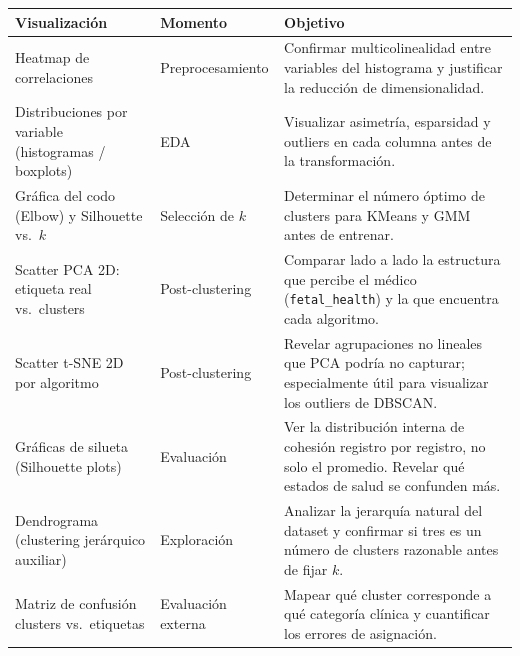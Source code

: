 \documentclass[12pt,letterpaper]{article}
\renewcommand{\arraystretch}{1.30}
\begin{document}
\begin{table}[H]
\centering
\small
\renewcommand{\arraystretch}{1.3}
\begin{tabular}{|p{3cm}|p{3.3cm}|p{7.5cm}|}
\hline
\rowcolor{headbg}
\textbf{Visualización} & \textbf{Momento} & \textbf{Objetivo} \\
\hline
Heatmap de correlaciones & Preprocesamiento & Confirmar multicolinealidad entre variables del histograma y justificar la reducción de dimensionalidad. \\
\hline
Distribuciones por variable (histogramas / boxplots) & EDA & Visualizar asimetría, esparsidad y outliers en cada columna antes de la transformación. \\
\hline
Gráfica del codo (Elbow) y Silhouette vs.\ $k$ & Selección de $k$ & Determinar el número óptimo de clusters para K\-Means y GMM antes de entrenar. \\
\hline
Scatter PCA 2D: etiqueta real vs.\ clusters & Post-clustering & Comparar lado a lado la estructura que percibe el médico (\texttt{fetal\_health}) y la que encuentra cada algoritmo. \\
\hline
Scatter t-SNE 2D por algoritmo & Post-clustering & Revelar agrupaciones no lineales que PCA podría no capturar; especialmente útil para visualizar los outliers de DBSCAN. \\
\hline
Gráficas de silueta (Silhouette plots) & Evaluación & Ver la distribución interna de cohesión registro por registro, no solo el promedio. Revelar qué estados de salud se confunden más. \\
\hline
Dendrograma (clustering jerárquico auxiliar) & Exploración & Analizar la jerarquía natural del dataset y confirmar si tres es un número de clusters razonable antes de fijar $k$. \\
\hline
Matriz de confusión clusters vs.\ etiquetas & Evaluación externa & Mapear qué cluster corresponde a qué categoría clínica y cuantificar los errores de asignación. \\
\hline
\end{tabular}
\end{table}
\end{document}
